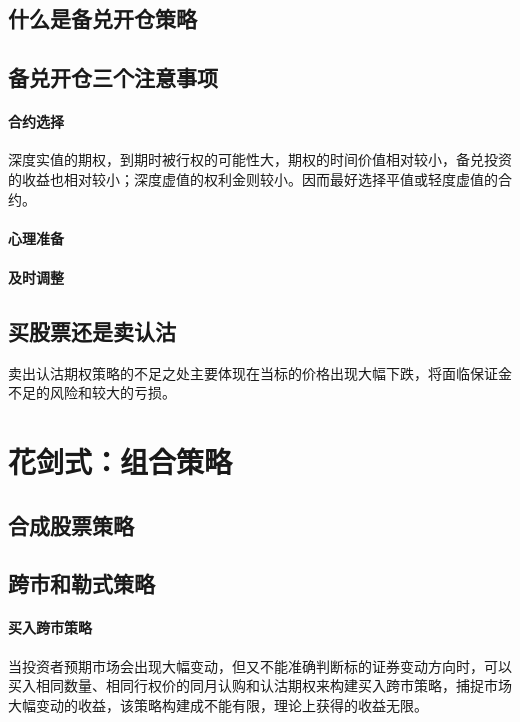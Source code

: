 \documentclass{article}
\begin{document}
\subsection{什么是备兑开仓策略}
\subsection{备兑开仓三个注意事项}
\paragraph{合约选择}
深度实值的期权，到期时被行权的可能性大，期权的时间价值相对较小，备兑投资的收益也相对较小；深度虚值的权利金则较小。因而最好选择平值或轻度虚值的合约。
\paragraph{心理准备}
\paragraph{及时调整}
\subsection{买股票还是卖认沽}
卖出认沽期权策略的不足之处主要体现在当标的价格出现大幅下跌，将面临保证金不足的风险和较大的亏损。
\section{花剑式：组合策略}
\subsection{合成股票策略}
\subsection{跨市和勒式策略}
\paragraph{买入跨市策略}
当投资者预期市场会出现大幅变动，但又不能准确判断标的证券变动方向时，可以买入相同数量、相同行权价的同月认购和认沽期权来构建买入跨市策略，捕捉市场大幅变动的收益，该策略构建成不能有限，理论上获得的收益无限。


\section{}
\end{document}
